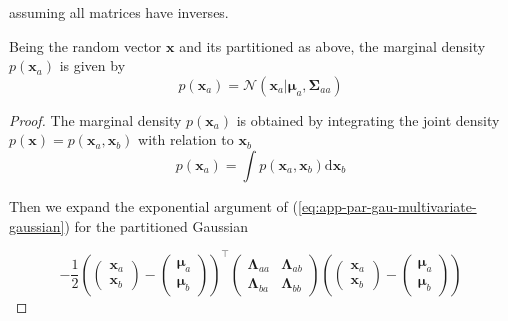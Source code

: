 \begin{appendices}
  assuming all matrices have inverses.

  \begin{theorem}[Marginalization]
    Being the random vector $\mathbf{x}$ and its partitioned as above, the marginal density $p(\mathbf{x}_a)$ is given by
    \begin{displaymath}
      p(\mathbf{x}_a) = \mathcal{N}\left( \mathbf{x}_a | \boldsymbol{\mu}_a, \boldsymbol{\Sigma}_{aa} \right)
    \end{displaymath}
  \end{theorem}

  \begin{proof}
    The marginal density $p(\mathbf{x}_a)$ is obtained by integrating the joint density $p(\mathbf{x})=p\left(\mathbf{x}_{a}, \mathbf{x}_{b}\right)$ with relation to $\mathbf{x}_b$
    \begin{equation}
      p\left(\mathbf{x}_{a}\right)=\int p\left(\mathbf{x}_{a}, \mathbf{x}_{b}\right) \mathrm{d} \mathbf{x}_{b}
    \end{equation}

    Then we expand the exponential argument of (\ref{eq:app-par-gau-multivariate-gaussian}) for the partitioned Gaussian

    \begin{equation}
      -\frac{1}{2}
      \left( \begin{pmatrix}
        \mathbf{x}_a \\  
        \mathbf{x}_b 
        \end{pmatrix}
        -\begin{pmatrix}
          \boldsymbol{\mu}_a \\
          \boldsymbol{\mu}_b
        \end{pmatrix}
        \right)^\top
        \begin{pmatrix}
          \boldsymbol{\Lambda}_{aa} & \boldsymbol{\Lambda}_{ab}  \\
          \boldsymbol{\Lambda}_{ba} & \boldsymbol{\Lambda}_{bb}
        \end{pmatrix} 
        \left( \begin{pmatrix}
          \mathbf{x}_a \\  
          \mathbf{x}_b 
          \end{pmatrix}
          -\begin{pmatrix}
            \boldsymbol{\mu}_a \\
            \boldsymbol{\mu}_b
          \end{pmatrix}
          \right)
    \end{equation}
    

\end{proof}
\end{appendices}
